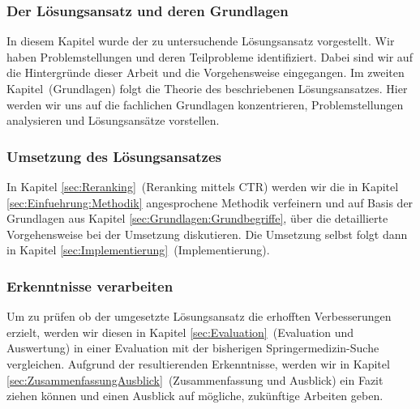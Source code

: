 \subsubsection{Der Lösungsansatz und deren Grundlagen}
\label{sec:Einfuehrung:GliederungAufbau:Loesungsansatz}

In diesem Kapitel wurde der zu untersuchende Lösungsansatz vorgestellt. Wir haben Problemstellungen und deren Teilprobleme identifiziert. Dabei sind wir auf die Hintergründe dieser Arbeit und die Vorgehensweise eingegangen. Im zweiten Kapitel~(Grundlagen) folgt die Theorie des beschriebenen Lösungsansatzes. Hier werden wir uns auf die fachlichen Grundlagen konzentrieren, Problemstellungen analysieren und Lösungsansätze vorstellen.

\subsubsection{Umsetzung des Lösungsansatzes}
\label{sec:Einfuehrung:GliederungAufbau:Umsetzung}

In Kapitel \ref{sec:Reranking}~(Reranking mittels CTR) werden wir die in Kapitel \ref{sec:Einfuehrung:Methodik} angesprochene Methodik verfeinern und auf Basis der Grundlagen aus Kapitel \ref{sec:Grundlagen:Grundbegriffe}, über die detaillierte Vorgehensweise bei der Umsetzung diskutieren. Die Umsetzung selbst folgt dann in Kapitel \ref{sec:Implementierung}~(Implementierung).

\subsubsection{Erkenntnisse verarbeiten}
\label{sec:Einfuehrung:GliederungAufbau:Erkenntnisse}

Um zu prüfen ob der umgesetzte Lösungsansatz die erhofften Verbesserungen erzielt, werden wir diesen in Kapitel \ref{sec:Evaluation}~(Evaluation und Auswertung) in einer Evaluation mit der bisherigen Springermedizin-Suche vergleichen. Aufgrund der resultierenden Erkenntnisse, werden wir in Kapitel \ref{sec:ZusammenfassungAusblick}~(Zusammenfassung und Ausblick) ein Fazit ziehen können und einen Ausblick auf mögliche, zukünftige Arbeiten geben.
